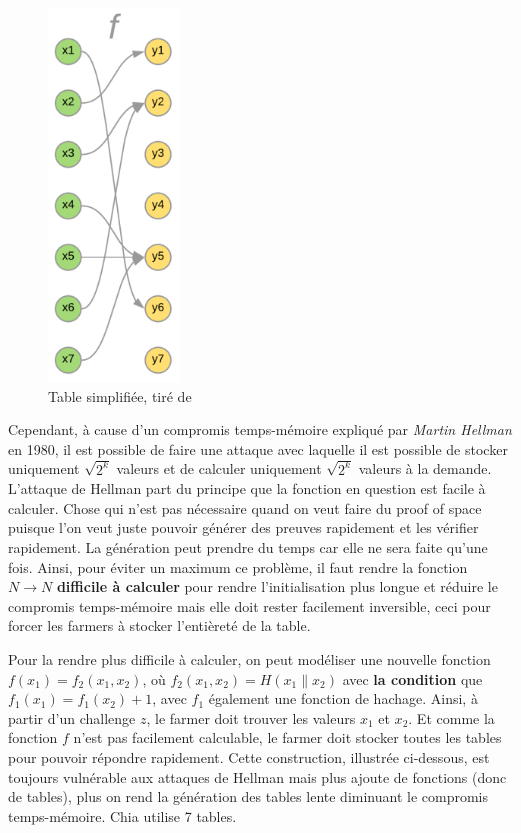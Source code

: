 \begin{figure}[H]
  \centering
  \includegraphics[width=3.5cm]{images/pospace_1.png}
  \caption{Table simplifiée, tiré de \cite{chia:construction}}
\end{figure}

Cependant, à cause d'un compromis temps-mémoire expliqué par \emph{Martin Hellman} en 1980, il est possible de faire une attaque avec laquelle il est possible de stocker uniquement $\sqrt{2^k}$ valeurs et de calculer uniquement $\sqrt{2^k}$ valeurs à la demande. L'attaque de Hellman part du principe que la fonction en question est facile à calculer. Chose qui n'est pas nécessaire quand on veut faire du proof of space puisque l'on veut juste pouvoir générer des preuves rapidement et les vérifier rapidement. La génération peut prendre du temps car elle ne sera faite qu'une fois. Ainsi, pour éviter un maximum ce problème, il faut rendre la fonction $N \rightarrow N$ \textbf{difficile à calculer} pour rendre l'initialisation plus longue et réduire le compromis temps-mémoire mais elle doit rester facilement inversible, ceci pour forcer les farmers à stocker l'entièreté de la table.

Pour la rendre plus difficile à calculer, on peut modéliser une nouvelle fonction $f(x_1)=f_2(x_1,x_2)$, où $f_2(x_1,x_2)=H(x_1\|x_2)$ avec \textbf{la condition} que $f_1(x_1)=f_1(x_2)+1$, avec $f_1$ également une fonction de hachage. Ainsi, à partir d'un challenge $z$, le farmer doit trouver les valeurs $x_1$ et $x_2$. Et comme la fonction $f$ n'est pas facilement calculable, le farmer doit stocker toutes les tables pour pouvoir répondre rapidement. Cette construction, illustrée ci-dessous, est toujours vulnérable aux attaques de Hellman mais plus ajoute de fonctions (donc de tables), plus on rend la génération des tables lente diminuant le compromis temps-mémoire. Chia utilise 7 tables.

